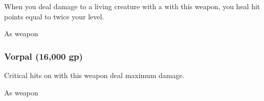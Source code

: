 When you deal damage to a living creature with a  with this weapon, you heal hit points equal to twice your level.



 


 As weapon


\lowercase{\hypertarget{item:Vorpal}{}}\label{item:Vorpal}
\hypertarget{item:Vorpal}{\subsubsection{Vorpal\hfill{} (16,000 gp)}}

Critical hits on  with this weapon deal maximum damage.



 As weapon
